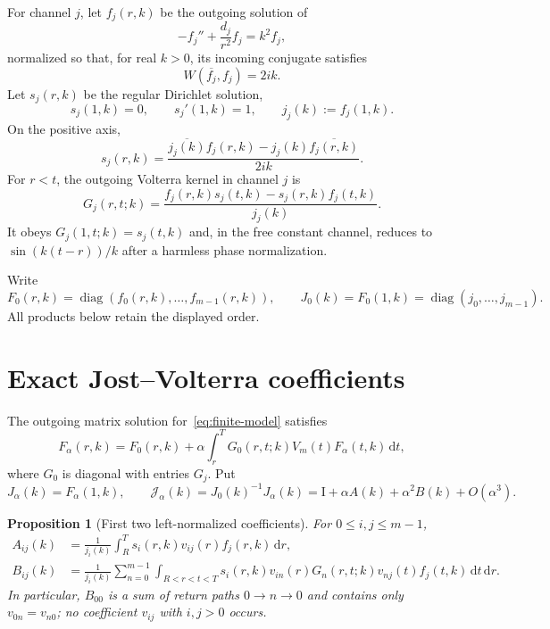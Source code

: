 \documentclass[11pt]{article}
\newcommand{\Id}{\mathrm I}
\newcommand{\dd}{\,\mathrm d}
\newcommand{\cJ}{\mathcal J}
\newtheorem{proposition}{Proposition}[section]
\theoremstyle{definition}
\begin{document}
For channel $j$, let $f_j(r,k)$ be the outgoing solution of
\begin{equation}
 -f_j''+\frac{d_j}{r^2}f_j=k^2f_j,
\end{equation}
normalized so that, for real $k>0$, its incoming conjugate satisfies
\begin{equation}
 W(\overline{f_j},f_j)=2ik.
\end{equation}
Let $s_j(r,k)$ be the regular Dirichlet solution,
\begin{equation}
 s_j(1,k)=0,
 \qquad s_j'(1,k)=1,
 \qquad j_j(k):=f_j(1,k).
\end{equation}
On the positive axis,
\begin{equation}
 s_j(r,k)=\frac{\overline{j_j(k)}f_j(r,k)-j_j(k)\overline{f_j(r,k)}}{2ik}.
 \label{eq:regular-jost}
\end{equation}
For $r<t$, the outgoing Volterra kernel in channel $j$ is
\begin{equation}
 G_j(r,t;k)
 =\frac{f_j(r,k)s_j(t,k)-s_j(r,k)f_j(t,k)}{j_j(k)}.
 \label{eq:green-factorization}
\end{equation}
It obeys $G_j(1,t;k)=s_j(t,k)$ and, in the free constant channel, reduces to $\sin(k(t-r))/k$ after a harmless phase normalization.

Write
\begin{equation}
 F_0(r,k)=\operatorname{diag}(f_0(r,k),\dots,f_{m-1}(r,k)),
 \qquad
 J_0(k)=F_0(1,k)=\operatorname{diag}(j_0,\dots,j_{m-1}).
\end{equation}
All products below retain the displayed order.

\section{Exact Jost--Volterra coefficients}

The outgoing matrix solution for~\eqref{eq:finite-model} satisfies
\begin{equation}
 F_\alpha(r,k)=F_0(r,k)
 +\alpha\int_r^T G_0(r,t;k)V_m(t)F_\alpha(t,k)\dd t,
 \label{eq:jost-volterra}
\end{equation}
where $G_0$ is diagonal with entries $G_j$.  Put
\begin{equation}
 J_\alpha(k)=F_\alpha(1,k),
 \qquad
 \cJ_\alpha(k)=J_0(k)^{-1}J_\alpha(k)
 =\Id+\alpha A(k)+\alpha^2B(k)+O(\alpha^3).
 \label{eq:left-normalization}
\end{equation}

\begin{proposition}[First two left-normalized coefficients]
\label{prop:volterra-coefficients}
For $0\leq i,j\leq m-1$,
\begin{align}
 A_{ij}(k)
 &=\frac1{j_i(k)}\int_R^T
 s_i(r,k)v_{ij}(r)f_j(r,k)\dd r,
 \label{eq:Aij}\\
 B_{ij}(k)
 &=\frac1{j_i(k)}\sum_{n=0}^{m-1}
 \int_{R<r<t<T}
 s_i(r,k)v_{in}(r)G_n(r,t;k)v_{nj}(t)f_j(t,k)
 \dd t\dd r.
 \label{eq:Bij}
\end{align}
In particular, $B_{00}$ is a sum of return paths $0\to n\to0$ and contains only $v_{0n}=v_{n0}$; no coefficient $v_{ij}$ with $i,j>0$ occurs.
\end{proposition}
\end{document}
